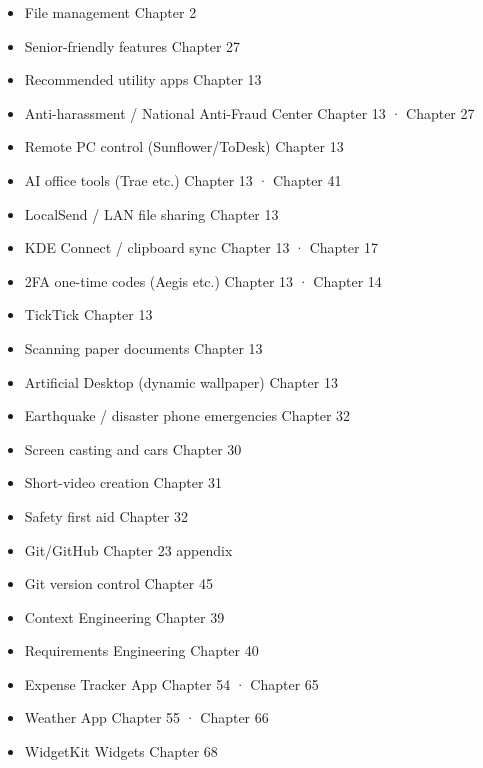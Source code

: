 
\begin{itemize}
  \item File management Chapter 2
  \item Senior-friendly features Chapter 27
  \item Recommended utility apps Chapter 13
  \item Anti-harassment / National Anti-Fraud Center Chapter 13 · Chapter 27
  \item Remote PC control (Sunflower/ToDesk) Chapter 13
  \item AI office tools (Trae etc.) Chapter 13 · Chapter 41
  \item LocalSend / LAN file sharing Chapter 13
  \item KDE Connect / clipboard sync Chapter 13 · Chapter 17
  \item 2FA one-time codes (Aegis etc.) Chapter 13 · Chapter 14
  \item TickTick Chapter 13
  \item Scanning paper documents Chapter 13
  \item Artificial Desktop (dynamic wallpaper) Chapter 13
  \item Earthquake / disaster phone emergencies Chapter 32
  \item Screen casting and cars Chapter 30
  \item Short-video creation Chapter 31
  \item Safety first aid Chapter 32
  \item Git/GitHub Chapter 23 appendix
  \item Git version control Chapter 45
  \item Context Engineering Chapter 39
  \item Requirements Engineering Chapter 40
  \item Expense Tracker App Chapter 54 · Chapter 65
  \item Weather App Chapter 55 · Chapter 66
  \item WidgetKit Widgets Chapter 68
\end{itemize}
